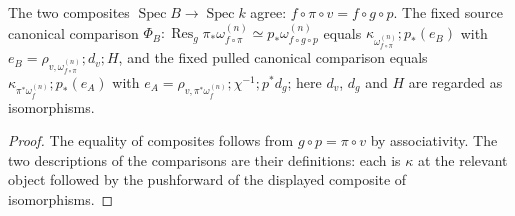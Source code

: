 \begin{lemma}
\label{lem:kn-native-chart-comparison-words}
\leanok
The two composites $\operatorname{Spec}B\to\operatorname{Spec}k$ agree:
$f\circ\pi\circ v=f\circ g\circ p$. The fixed source canonical comparison
$\Phi_B:\operatorname{Res}_g\pi_*\omega_{f\circ\pi}^{(n)}\simeq
p_*\omega_{f\circ g\circ p}^{(n)}$ equals
$\kappa_{\omega_{f\circ\pi}^{(n)}};p_*(e_B)$ with
$e_B=\rho_{v,\omega_{f\circ\pi}^{(n)}};d_v;H$, and the fixed pulled canonical
comparison equals $\kappa_{\pi^*\omega_f^{(n)}};p_*(e_A)$ with
$e_A=\rho_{v,\pi^*\omega_f^{(n)}};\chi^{-1};p^*d_g$; here $d_v$, $d_g$ and $H$
are regarded as isomorphisms.
\end{lemma}
\begin{proof}
The equality of composites follows from $g\circ p=\pi\circ v$ by
associativity. The two descriptions of the comparisons are their definitions:
each is $\kappa$ at the relevant object followed by the pushforward of the
displayed composite of isomorphisms.
\end{proof}

